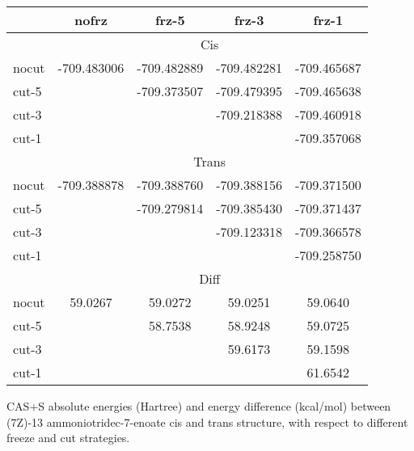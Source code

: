 \begin{center}
\begin{threeparttable}
\begin{tabular}{lcccc}
\hline
    		&		nofrz			&	frz-5				&	frz-3				&	frz-1	\\	
\hline
			&	\multicolumn{4}{c}{Cis} \\
nocut		&	-709.483006     	&	-709.482889     	&	-709.482281     	&	-709.465687      \\
cut-5		&						&	-709.373507  		&   -709.479395  		&	-709.465638      \\
cut-3		&						&						&	-709.218388     	&	-709.460918      \\
cut-1		&						&						&						&	-709.357068    	 \\
			&	\multicolumn{4}{c}{Trans} \\
nocut		&	-709.388878     	&	-709.388760     	&	-709.388156     	&	-709.371500      \\
cut-5		&						&	-709.279814  		&   -709.385430  		&	-709.371437      \\
cut-3		&						&						&	-709.123318     	&	-709.366578      \\
cut-1		&						&						&						&	-709.258750    	 \\
			&	\multicolumn{4}{c}{Diff} \\
nocut		&	59.0267         	&	59.0272         	&	59.0251         	&	59.0640        	 \\
cut-5		&						&	58.7538         	&	58.9248         	&	59.0725          \\
cut-3		&						&						&	59.6173         	&	59.1598          \\
cut-1		&						&						&						&	61.6542        	 \\
\hline
\end{tabular}
\caption{\footnotesize CAS+S absolute energies (Hartree) and energy
difference (kcal/mol) between (7Z)-13 ammoniotridec-7-enoate cis and trans
structure, with respect to different freeze and cut strategies.}
\label{tbl:7Z-cis-trans-diff}
\end{threeparttable}
\end{center}
